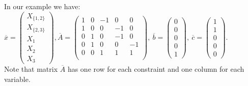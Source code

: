 \begin{ex}
    In our example we have: $\overline{x} =
    \begin{pmatrix}
        X_{\{1,2\}} \\ X_{\{2,3\}} \\ X_1 \\ X_2 \\ X_3
    \end{pmatrix}, \overline{A} =
    \begin{pmatrix}
    1 & 0 & -1 & 0 & 0 \\
    1 & 0 & 0 & -1 & 0 \\
    0 & 1 & 0 & -1 & 0 \\
    0 & 1 & 0 & 0 & -1 \\
    0 & 0 & 1 & 1 & 1 \\
    \end{pmatrix},\ \overline{b} =
    \begin{pmatrix}
        0 \\ 0 \\ 0 \\ 0 \\ 1
    \end{pmatrix},\ \overline{c} =
    \begin{pmatrix}
        1 \\ 1 \\ 0 \\ 0 \\ 0
    \end{pmatrix}$.\\
    Note that matrix $\overline{A}$ has one row for each constraint and one column for each variable.
    

\end{ex}
